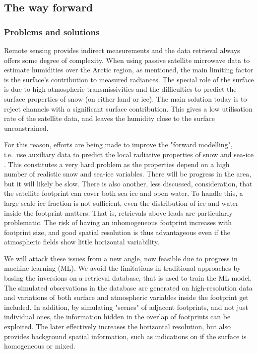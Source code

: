 \documentclass[12pt,oneside,a4paper]{article}
\begin{document}
\subsection{The way forward}

\subsubsection{Problems and solutions}

Remote sensing provides indirect measurements and the data retrieval always
offers some degree of complexity. When using passive satellite microwave data
to estimate humidities over the Arctic region, as mentioned, the main
limiting factor is the surface's contribution to measured radiances. The
special role of the surface is due to high atmospheric transmissivities and the
difficulties to predict the surface properties of snow (on either land or ice).
The main solution today is to reject channels with a significant surface
contribution. This gives a low utilisation rate of the satellite data, and
leaves the humidity close to the surface unconstrained.

For this reason, efforts are being made to improve the "forward modelling",
i.e.\ use auxiliary data to predict the local radiative properties of snow and sea-ice \citep[e.g.][]{tonboe:2010:thesi}. This constitutes a very hard problem as the properties depend on a high number of realistic snow and sea-ice variables. There will be progress in the area, but it will likely be slow. There is also another, less discussed, consideration, that the satellite footprint can cover both sea ice and open water. To handle this, a large scale ice-fraction is not sufficient, even the distribution of ice and water inside the footprint matters. That is, retrievals above leads are particularly
problematic. The risk of having an inhomogeneous footprint increases with
footprint size, and good spatial resolution is thus advantageous even if the
atmospheric fields show little horizontal variability.


We will attack these issues from a new angle, now feasible due to progress in
machine learning (ML). We avoid the limitations in traditional approaches by
basing the inversions on a retrieval database, that is used to train the ML
model. The simulated observations in the database are generated on
high-resolution data and variations of both surface and atmospheric variables
inside the footprint get included. In addition, by simulating "scenes" of
adjacent footprints, and not just individual ones, the information hidden in
the overlap of footprints can be exploited. The later effectively increases the
horizontal resolution, but also provides background spatial information, such
as indications on if the surface is homogeneous or mixed.
\end{document}
